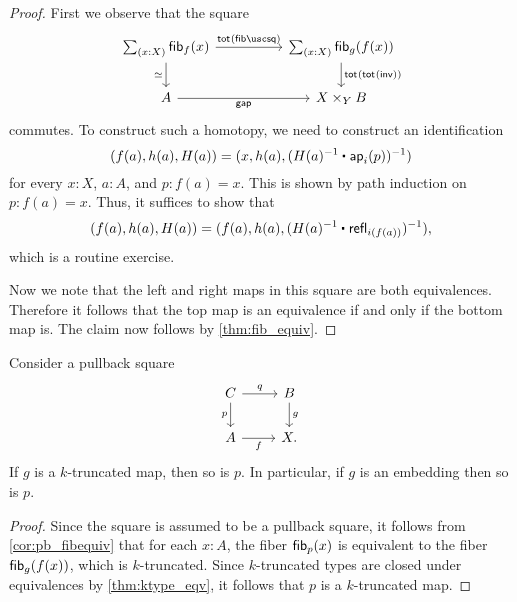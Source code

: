 \begin{proof}
First we observe that the square
\begin{equation*}
\begin{tikzcd}[column sep=huge]
\sm{x:X}\fib{f}{x} \arrow[d,swap,"\eqvsym"] \arrow[r,"\tot{\fibsquare}"] &
\sm{x:X}\fib{g}{f(x)} \arrow[d,"\tot{\tot{\mathsf{inv}}}"] \\
A \arrow[r,swap,"\mathsf{gap}"] & X \times_Y B
\end{tikzcd}
\end{equation*}
commutes. To construct such a homotopy, we need to construct an identification
\begin{equation*}
(f(a),h(a),H(a))=(x,h(a),(\ct{H(a)^{-1}}{\ap{i}{p}})^{-1})
\end{equation*}
for every $x : X$, $a : A$, and $p : f(a) = x$. This is shown by path induction on $p : f(a)=x$. Thus, it suffices to show that
\begin{equation*}
(f(a),h(a),H(a))=(f(a),h(a),(\ct{H(a)^{-1}}{\refl{i(f(a))}})^{-1}),
\end{equation*}
which is a routine exercise. 

Now we note that the left and right maps in this square are both equivalences. Therefore it follows that the top map is an equivalence if and only if the bottom map is. The claim now follows by \cref{thm:fib_equiv}.
\end{proof}

\begin{cor}\label{cor:pb_trunc}
Consider a pullback square
\begin{equation*}
\begin{tikzcd}
C \arrow[r,"q"] \arrow[d,swap,"p"] & B \arrow[d,"g"] \\
A \arrow[r,swap,"f"] & X.
\end{tikzcd}
\end{equation*}
If $g$ is a $k$-truncated map, then so is $p$. In particular, if $g$ is an embedding then so is $p$.
\end{cor}

\begin{proof}
Since the square is assumed to be a pullback square, it follows from \cref{cor:pb_fibequiv} that for each $x:A$, the fiber $\mathsf{fib}_{p}(x)$ is equivalent to the fiber $\mathsf{fib}_{g}(f(x))$, which is $k$-truncated. Since $k$-truncated types are closed under equivalences by \cref{thm:ktype_eqv}, it follows that $p$ is a $k$-truncated map.
\end{proof}

